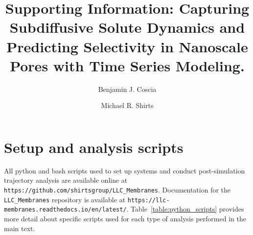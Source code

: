 \documentclass{article}
\title{Supporting Information: Capturing Subdiffusive Solute Dynamics and 
Predicting Selectivity in Nanoscale Pores with Time Series Modeling.}
\author{Benjamin J. Coscia \and Michael R. Shirts}
\begin{document}
  \maketitle
  \tableofcontents
 \graphicspath{{./supporting_figures/}}
  
  
  \newpage  
  
  \section{Setup and analysis scripts}\label{section:python_scripts}

  All python and bash scripts used to set up systems and conduct post-simulation trajectory
  analysis are available online at \texttt{https://github.com/shirtsgroup/LLC\_Membranes}.
  Documentation for the \texttt{LLC\_Membranes} repository is available at
  \texttt{https://llc-membranes.readthedocs.io/en/latest/}. Table~\ref{table:python_scripts}
  provides more detail about specific scripts used for each type of analysis performed in
  the main text.
\end{document}
